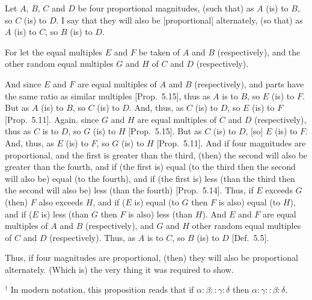 \begin{Parallel}{}{}
{Let $A$, $B$, $C$ and $D$ be four proportional magnitudes, (such that) as $A$
(is) to $B$, so $C$ (is) to $D$. I say that they will also be [proportional]
 alternately, (so that) as $A$ (is) to $C$, so $B$ (is) to $D$.
 
For let the equal multiples $E$ and $F$ be taken of $A$ and $B$ (respectively),
and the other random equal multiples $G$ and $H$ of $C$ and $D$ (respectively).

\epsfysize=1in
\centerline{}

And since $E$ and $F$ are equal multiples of $A$ and $B$ (respectively),
and parts  have the same ratio as similar multiples [Prop.~5.15], thus as $A$ is to $B$, so $E$ (is) to $F$.
But as $A$ (is) to $B$, so $C$ (is) to $D$. And, thus, as $C$ (is) to $D$, so
$E$ (is) to $F$ [Prop.~5.11].
Again, since $G$ and $H$ are equal multiples of $C$ and $D$ (respectively),  thus
as $C$  is to $D$, so $G$ (is) to $H$ [Prop.~5.15].
But as $C$ (is) to $D$, [so] $E$ (is) to $F$. And, thus, as $E$ (is) to $F$, so
$G$ (is) to $H$ [Prop.~5.11]. And if four magnitudes are proportional, and the first is greater than the third, (then)
the second will also be greater than the fourth, and if (the first is) equal
(to the third then the second will also be) equal (to the fourth), and if
(the first is) less (than the third then the second will also be) less (than the fourth)
[Prop.~5.14]. Thus, if $E$ exceeds $G$ (then)
$F$ also exceeds $H$, and if ($E$ is) equal (to $G$ then $F$ is also) equal (to $H$), and if
($E$ is) less (than $G$ then $F$ is also) less (than $H$). And $E$ and $F$ are equal multiples of $A$ and $B$ (respectively), and $G$ and $H$ other random equal multiples
of $C$ and $D$ (respectively). Thus, as $A$ is to $C$, so $B$ (is) to $D$ [Def.~5.5].

Thus, if four magnitudes are proportional, (then) they will
also be proportional  alternately. (Which is) the very thing it was required to show.}
\end{Parallel}
{\footnotesize \noindent$^\dag$ In modern notation, this proposition
reads that if $\alpha:\beta::\gamma:\delta$ then $\alpha:\gamma::\beta:\delta$.}


